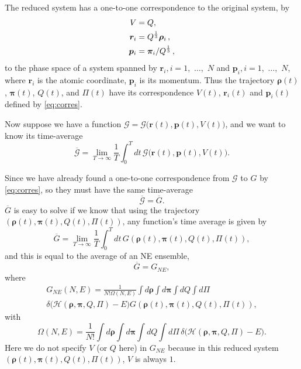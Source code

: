 The reduced system has a one-to-one correspondence to the original system, by
\begin{subequations}\label{eq:corres}
	\begin{align}
		V        & = Q,                                           \\
		\bm{r}_i & = Q^{\frac{ 1 }{ 3 }} \bm{\rho}_i \thinspace,  \\
		\bm{p}_i & = \bm{\pi}_i / Q^{\frac{ 1 }{ 3 }} \thinspace,
	\end{align}
\end{subequations}
to the phase space of a system spanned by
$\bm{r}_i, i=1$,~$\ldots$,~$N$ and
$\bm{p}_i, i=1$,~$\ldots$,~$N$,
where $\bm{r}_i$ is the atomic coordinate, $\bm{p}_i$ is its momentum.
Thus the trajectory
$\bm{\rho}(t)$, $\bm{\pi}(t)$, $Q(t)$, and $\Pi(t)$ have its
correspondence $V(t)$, $\bm{r}_i(t)$ and $\bm{p}_i(t)$ defined by
\eqref{eq:corres}.

Now suppose we have a function $\mathscr{G} = \mathscr{G}\big(\bm{r}(t), \bm{p}(t), V(t)\big)$,
and we want to know its time-average
\begin{equation}
	\overline{\mathscr{G}} =
	\lim_{T \rightarrow \infty} \frac{ 1 }{ T } \int_{0}^{T}  dt\,
	\mathscr{G}\big( \bm{r}(t), \bm{p}(t), V(t) \big).
\end{equation}

Since we have already found a one-to-one correspondence
from $\mathscr{G}$ to $G$ by
\eqref{eq:corres}, so they must have the same time-average
\begin{equation}\label{eq:bbgg}
	\overline{\mathscr{G}} = \overline{G}.
\end{equation}
$\overline{G}$ is easy to solve if we know
that using the trajectory
$(\bm{\rho}(t), \bm{\pi}(t), Q(t), \Pi(t))$,
any function's time average is given by
\begin{equation}
	\overline{G} = \lim_{T \rightarrow \infty} \frac{ 1 }{ T } \int_{0}^{T}  dt \,
	G(\bm{\rho}(t), \bm{\pi}(t), Q(t), \Pi(t)),
\end{equation}
and this is equal to the average of an NE ensemble,
\begin{equation}\label{eq:gbgne}
	\overline{G} = G_{NE},
\end{equation}
where
\begin{multline}
	G_{NE} (N, E) = \frac{ 1 }{ N! \Omega(N,E) } \int d\bm{\rho} \int d\bm{\pi}
	\int dQ \int d\Pi \\
	\delta \big( \mathcal{H}(\bm{\rho}, \bm{\pi}, Q, \Pi)
	- E \big) G(\bm{\rho}(t), \bm{\pi}(t), Q(t), \Pi(t)),
\end{multline}
with
\begin{equation}
	\Omega(N, E) = \frac{ 1 }{ N! }  \int d\bm{\rho} \int d\bm{\pi}
	\int dQ \int d\Pi \, \delta \big( \mathcal{H}(\bm{\rho}, \bm{\pi}, Q, \Pi)
	- E \big).
\end{equation}
Here we do not specify $V$ (or $Q$ here) in $G_{NE}$ because in this reduced system
$(\bm{\rho}(t), \bm{\pi}(t), Q(t), \Pi(t))$, $V$ is always $1$.

